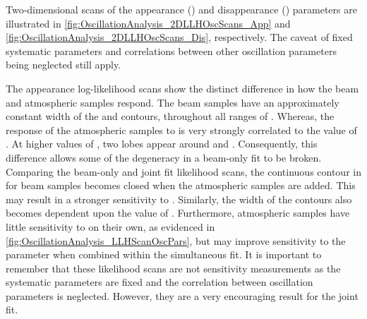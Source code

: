 
Two-dimensional scans of the appearance (\text{\textendash}) and disappearance (\text{\textendash}) parameters are illustrated in \autoref{fig:OscillationAnalysis_2DLLHOscScans_App} and \autoref{fig:OscillationAnalysis_2DLLHOscScans_Dis}, respectively. The caveat of fixed systematic parameters and correlations between other oscillation parameters being neglected still apply.

The appearance log-likelihood scans show the distinct difference in how the beam and atmospheric samples respond. The beam samples have an approximately constant width of the \quickmath{2\sigma} and \quickmath{3\sigma} contours, throughout all ranges of . Whereas, the response of the atmospheric samples to  is very strongly correlated to the value of . At higher values of , two lobes appear around  and . Consequently, this difference allows some of the degeneracy in a beam-only fit to be broken. Comparing the beam-only and joint fit likelihood scans, the \quickmath{2\sigma} continuous contour in  for beam samples becomes closed when the atmospheric samples are added. This may result in a stronger sensitivity to . Similarly, the width of the \quickmath{3\sigma} contours also becomes dependent upon the value of . Furthermore, atmospheric samples have little sensitivity to  on their own, as evidenced in \autoref{fig:OscillationAnalysis_LLHScanOscPars}, but may improve sensitivity to the parameter when combined within the simultaneous fit. It is important to remember that these likelihood scans are not sensitivity measurements as the systematic parameters are fixed and the correlation between oscillation parameters is neglected. However, they are a very encouraging result for the joint fit. 

